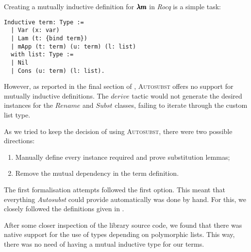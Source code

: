 
Creating a mutually inductive definition for $\pmb{\lambda m}$ in \textit{Rocq} is a simple task:

\begin{lstlisting}[language=Coq]
  Inductive term: Type :=
  | Var (x: var)
  | Lam (t: {bind term})
  | mApp (t: term) (u: term) (l: list)
  with list: Type :=
  | Nil
  | Cons (u: term) (l: list). 
\end{lstlisting}

However, as reported in the final section of \cite{AutosubstSchafer}, \textsc{Autosubst} offers no support for mutually inductive definitions.
The \lst$derive$ tactic would not generate the desired instances for the \lst$Rename$ and \lst$Subst$ classes, failing to iterate through the custom list type.

As we tried to keep the decision of using \textsc{Autosubst}, there were two possible directions:

\begin{enumerate}
\item Manually define every instance required and prove substitution lemmas;
\item Remove the mutual dependency in the term definition.
\end{enumerate}

The first formalisation attempts followed the first option.
This meant that everything \textit{Autosubst} could provide automatically was done by hand.
For this, we closely followed the definitions given in \cite{AutosubstSchafer}.


After some closer inspection of the library source code, we found that there was native support for the use of types depending on polymorphic lists.
This way, there was no need of having a mutual inductive type for our terms.

